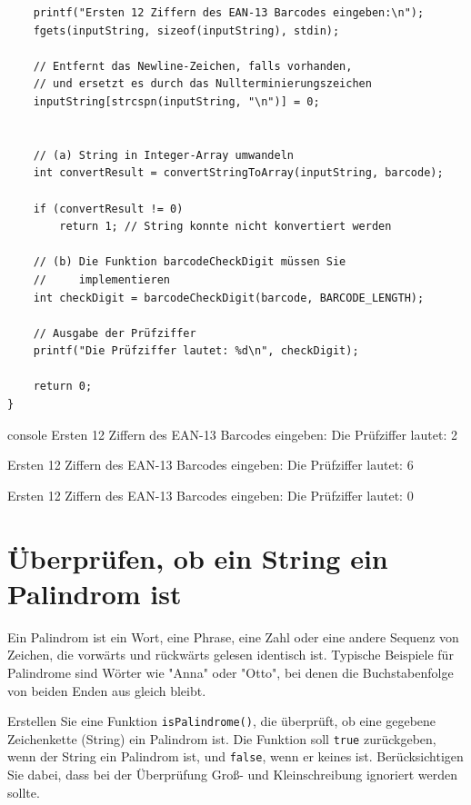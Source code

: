 \begin{enumerate}
\begin{verbatim}
    printf("Ersten 12 Ziffern des EAN-13 Barcodes eingeben:\n");
    fgets(inputString, sizeof(inputString), stdin);

    // Entfernt das Newline-Zeichen, falls vorhanden,
    // und ersetzt es durch das Nullterminierungszeichen
    inputString[strcspn(inputString, "\n")] = 0;


    // (a) String in Integer-Array umwandeln
    int convertResult = convertStringToArray(inputString, barcode);

    if (convertResult != 0)
        return 1; // String konnte nicht konvertiert werden

    // (b) Die Funktion barcodeCheckDigit müssen Sie
    //     implementieren
    int checkDigit = barcodeCheckDigit(barcode, BARCODE_LENGTH);

    // Ausgabe der Prüfziffer
    printf("Die Prüfziffer lautet: %d\n", checkDigit);

    return 0;
}
\end{verbatim}

\begin{mybox}[Bildschirmausgabe]{console}
Ersten 12 Ziffern des EAN-13 Barcodes eingeben:
Die Prüfziffer lautet: 2

Ersten 12 Ziffern des EAN-13 Barcodes eingeben:
Die Prüfziffer lautet: 6

Ersten 12 Ziffern des EAN-13 Barcodes eingeben:
Die Prüfziffer lautet: 0
\end{mybox}

\end{enumerate}



\chapter{Überprüfen, ob ein String ein Palindrom ist}

\vspace{10pt}

Ein Palindrom ist ein Wort, eine Phrase, eine Zahl oder eine andere Sequenz von
Zeichen, die vorwärts und rückwärts gelesen identisch ist. Typische Beispiele
für Palindrome sind Wörter wie "Anna" oder "Otto", bei denen die Buchstabenfolge
von beiden Enden aus gleich bleibt.

Erstellen Sie eine Funktion \texttt{isPalindrome()}, die überprüft, ob
eine gegebene Zeichenkette (String) ein Palindrom ist. Die Funktion soll
\texttt{true} zurückgeben, wenn der String ein Palindrom ist, und
\texttt{false}, wenn er keines ist. Berücksichtigen Sie dabei, dass bei
der Überprüfung Groß- und Kleinschreibung ignoriert werden sollte.

